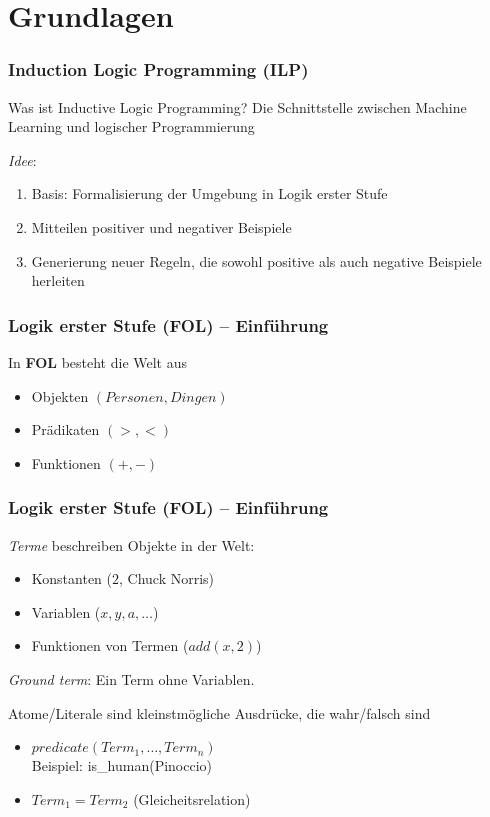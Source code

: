 \section{Grundlagen}

\begin{frame}
	\frametitle{Induction Logic Programming (ILP)}

	\begin{block}{Was ist Inductive Logic Programming?}
			Die Schnittstelle zwischen Machine Learning und logischer Programmierung
	\end{block}

	\emph{Idee}: 
			\begin{enumerate}
				\item Basis: Formalisierung der Umgebung in Logik erster Stufe
				\item Mitteilen positiver und negativer Beispiele
				\item Generierung neuer Regeln, die sowohl positive
					als auch negative Beispiele herleiten
			\end{enumerate}
\end{frame}

\begin{frame}
	\frametitle{Logik erster Stufe (FOL) -- Einführung}

	In \textbf{FOL} besteht die Welt aus
	\begin{itemize}
		\item Objekten  $(Personen, Dingen)$
		\item Prädikaten $(>, <)$
		\item Funktionen $(+, -)$
	\end{itemize}
\end{frame}

\begin{frame}
	\frametitle{Logik erster Stufe (FOL) -- Einführung}
	\emph{Terme} beschreiben Objekte in der Welt:\\
	\begin{itemize}
		\item Konstanten  ($2$, Chuck Norris)
		\item Variablen   ($x,y, a, \ldots$)
		\item Funktionen von Termen ($add(x,2)$)
	\end{itemize}

	\emph{Ground term}: Ein Term ohne Variablen.
	\pause

	\begin{block}{}
		Atome/Literale sind kleinstmögliche Ausdrücke, die wahr/falsch sind
		\begin{itemize}
			\item $predicate(Term_1, \ldots, Term_n)$\\ 
				Beispiel: is\_human(Pinoccio)
			\item $Term_1 = Term_2$ (Gleicheitsrelation)
		\end{itemize}
	\end{block}

\end{frame}


